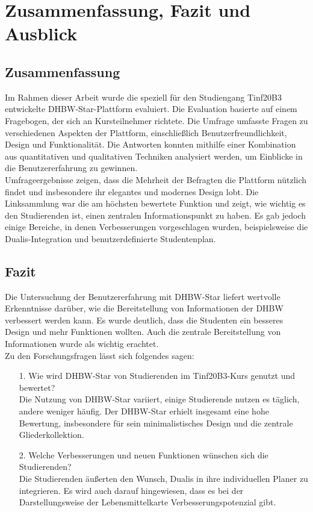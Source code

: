 \chapter{Zusammenfassung, Fazit und Ausblick}

\section{Zusammenfassung}
Im Rahmen dieser Arbeit wurde die speziell für den Studiengang Tinf20B3 entwickelte DHBW-Star-Plattform evaluiert. Die Evaluation basierte auf einem Fragebogen, der sich an Kursteilnehmer richtete. Die Umfrage umfasste Fragen zu verschiedenen Aspekten der Plattform, einschließlich  Benutzerfreundlichkeit, Design und  Funktionalität. Die Antworten konnten mithilfe einer Kombination aus quantitativen und qualitativen Techniken analysiert werden, um  Einblicke in die Benutzererfahrung zu gewinnen.\\
 
Umfrageergebnisse zeigen, dass die Mehrheit der Befragten die Plattform  nützlich findet und insbesondere ihr elegantes und modernes Design lobt. Die Linksammlung war die am höchsten bewertete Funktion und zeigt, wie wichtig es den Studierenden ist, einen zentralen Informationspunkt zu haben. Es gab jedoch einige Bereiche, in denen Verbesserungen vorgeschlagen wurden, beispielsweise die Dualis-Integration und benutzerdefinierte Studentenplan.
\newpage
\section{Fazit}
Die Untersuchung der Benutzererfahrung mit DHBW-Star liefert wertvolle Erkenntnisse darüber, wie die Bereitstellung von Informationen der DHBW verbessert werden kann. Es wurde deutlich, dass die Studenten ein besseres Design und mehr Funktionen wollten. Auch die zentrale Bereitstellung von Informationen  wurde als wichtig erachtet. 
\\
Zu den  Forschungsfragen lässt sich folgendes sagen:
\begin{itemize}
	\item [1.] Wie wird DHBW-Star von  Studierenden im Tinf20B3-Kurs genutzt und bewertet?\\
	Die Nutzung von DHBW-Star variiert,  einige Studierende  nutzen es täglich, andere weniger häufig. Der DHBW-Star erhielt insgesamt eine hohe Bewertung, insbesondere für sein minimalistisches Design und die zentrale Gliederkollektion. 
	\item[2.]Welche Verbesserungen und neuen Funktionen wünschen sich die Studierenden?\\
	Die Studierenden äußerten den Wunsch, Dualis in ihre individuellen Planer zu integrieren. Es wird auch darauf hingewiesen, dass es  bei der Darstellungsweise der Lebensmittelkarte Verbesserungspotenzial gibt.
\end{itemize}

